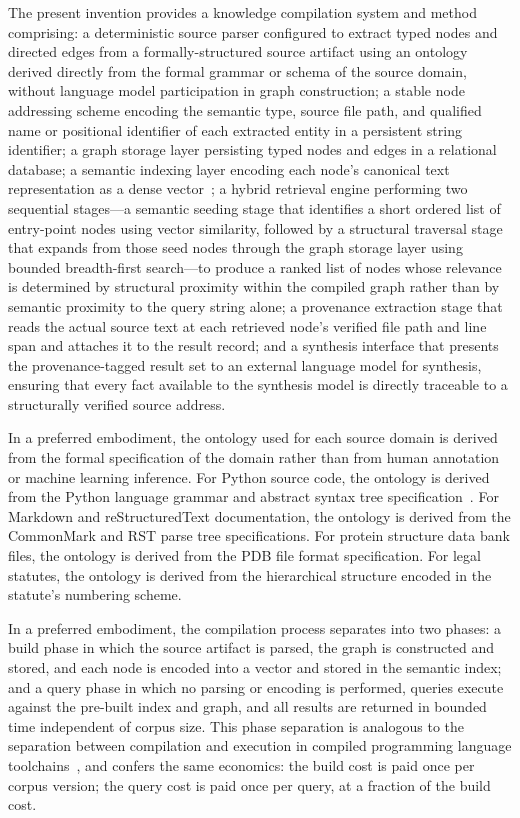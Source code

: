 \documentclass[12pt]{article}
\begin{document}
The present invention provides a knowledge compilation system and method
comprising: a deterministic source parser configured to extract typed nodes and
directed edges from a formally-structured source artifact using an ontology
derived directly from the formal grammar or schema of the source domain, without
language model participation in graph construction; a stable node addressing
scheme encoding the semantic type, source file path, and qualified name or
positional identifier of each extracted entity in a persistent string identifier;
a graph storage layer persisting typed nodes and edges in a relational database;
a semantic indexing layer encoding each node's canonical text representation as a
dense vector~\cite{reimers2019sbert}; a hybrid retrieval engine performing two
sequential stages---a semantic seeding stage that identifies a short ordered list
of entry-point nodes using vector similarity, followed by a structural traversal
stage that expands from those seed nodes through the graph storage layer using
bounded breadth-first search---to produce a ranked list of nodes whose relevance
is determined by structural proximity within the compiled graph rather than by
semantic proximity to the query string alone; a provenance extraction stage that
reads the actual source text at each retrieved node's verified file path and line
span and attaches it to the result record; and a synthesis interface that
presents the provenance-tagged result set to an external language model for
synthesis, ensuring that every fact available to the synthesis model is directly
traceable to a structurally verified source address.

In a preferred embodiment, the ontology used for each source domain is derived
from the formal specification of the domain rather than from human annotation or
machine learning inference. For Python source code, the ontology is derived from
the Python language grammar and abstract syntax tree specification~\cite{python_ast}.
For Markdown and reStructuredText documentation, the ontology is derived from the
CommonMark and RST parse tree specifications. For protein structure data bank
files, the ontology is derived from the PDB file format specification. For legal
statutes, the ontology is derived from the hierarchical structure encoded in the
statute's numbering scheme.

In a preferred embodiment, the compilation process separates into two phases: a
build phase in which the source artifact is parsed, the graph is constructed and
stored, and each node is encoded into a vector and stored in the semantic index;
and a query phase in which no parsing or encoding is performed, queries execute
against the pre-built index and graph, and all results are returned in bounded
time independent of corpus size. This phase separation is analogous to the
separation between compilation and execution in compiled programming language
toolchains~\cite{aho2006compilers}, and confers the same economics: the build
cost is paid once per corpus version; the query cost is paid once per query, at a
fraction of the build cost.
\end{document}
